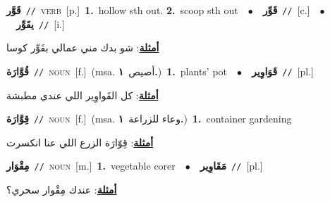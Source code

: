\documentclass[10pt,a4paper,twoside]{article} %
\begin{document}
\begin{multicols}{2}
{\setlength\topsep{0pt}\textbf{\foreignlanguage{arabic}{قَوَّر}}\ {\color{gray}\texttt{//}\color{black}}\ \textsc{verb}\ [p.]\ \textbf{1.}~hollow sth out.  \textbf{2.}~scoop sth out\ \ $\bullet$\ \ \setlength\topsep{0pt}\textbf{\foreignlanguage{arabic}{قَوِّر}}\ {\color{gray}\texttt{//}\color{black}}\ [c.]\ \ $\bullet$\ \ \setlength\topsep{0pt}\textbf{\foreignlanguage{arabic}{يقَوِّر}}\ {\color{gray}\texttt{//}\color{black}}\ [i.]\  \begin{flushright}\color{gray}\foreignlanguage{arabic}{\textbf{\underline{\foreignlanguage{arabic}{أمثلة}}}: شو بدك مني عمالي بقَوِّر كوسا}\end{flushright}\color{black}} \vspace{2mm}

{\setlength\topsep{0pt}\textbf{\foreignlanguage{arabic}{قُوَّارَة}}\ {\color{gray}\texttt{//}\color{black}}\ \textsc{noun}\ [f.]\ \color{gray}(msa. \foreignlanguage{arabic}{أصيص}~\foreignlanguage{arabic}{\textbf{١.}})\color{black}\ \textbf{1.}~plants' pot\ \ $\bullet$\ \ \setlength\topsep{0pt}\textbf{\foreignlanguage{arabic}{قَوَاوِير}}\ {\color{gray}\texttt{//}\color{black}}\ [pl.]\  \begin{flushright}\color{gray}\foreignlanguage{arabic}{\textbf{\underline{\foreignlanguage{arabic}{أمثلة}}}: كل القَواوِير اللي عندي مطبشة}\end{flushright}\color{black}} \vspace{2mm}

{\setlength\topsep{0pt}\textbf{\foreignlanguage{arabic}{قِوَّارَة}}\ {\color{gray}\texttt{//}\color{black}}\ \textsc{noun}\ [f.]\ \color{gray}(msa. \foreignlanguage{arabic}{وعاء للزراعة}~\foreignlanguage{arabic}{\textbf{١.}})\color{black}\ \textbf{1.}~container gardening\  \begin{flushright}\color{gray}\foreignlanguage{arabic}{\textbf{\underline{\foreignlanguage{arabic}{أمثلة}}}: قِوّارَة الزرع اللي عنا انكسرت}\end{flushright}\color{black}} \vspace{2mm}

{\setlength\topsep{0pt}\textbf{\foreignlanguage{arabic}{مِقْوَار}}\ {\color{gray}\texttt{//}\color{black}}\ \textsc{noun}\ [m.]\ \textbf{1.}~vegetable corer\ \ $\bullet$\ \ \setlength\topsep{0pt}\textbf{\foreignlanguage{arabic}{مَقَاوِير}}\ {\color{gray}\texttt{//}\color{black}}\ [pl.]\  \begin{flushright}\color{gray}\foreignlanguage{arabic}{\textbf{\underline{\foreignlanguage{arabic}{أمثلة}}}: عندك مِقْوار سحري؟}\end{flushright}\color{black}} \vspace{2mm}


\end{multicols}
\end{document}

